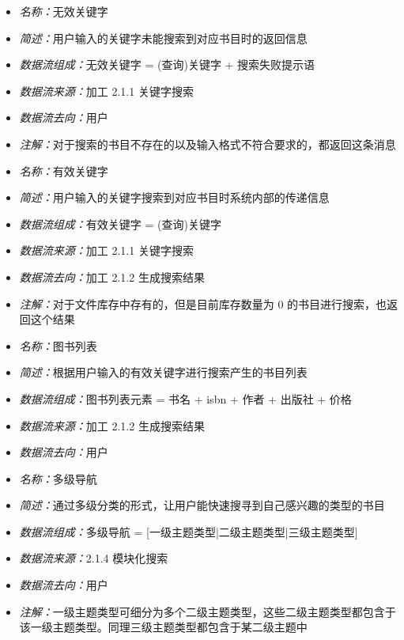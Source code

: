 \vspace{-1mm}

\begin{itemize}
	\item \textit{名称：}无效关键字
	\item \textit{简述：}用户输入的关键字未能搜索到对应书目时的返回信息
	\item \textit{数据流组成：}无效关键字 = (查询)关键字 + 搜索失败提示语
	\item \textit{数据流来源：}加工 2.1.1 关键字搜索
	\item \textit{数据流去向：}用户
	\item \textit{注解：}对于搜索的书目不存在的以及输入格式不符合要求的，都返回这条消息
\end{itemize}

\vspace{-1mm}

\begin{itemize}
	\item \textit{名称：}有效关键字
	\item \textit{简述：}用户输入的关键字搜索到对应书目时系统内部的传递信息
	\item \textit{数据流组成：}有效关键字 = (查询)关键字
	\item \textit{数据流来源：}加工 2.1.1 关键字搜索
	\item \textit{数据流去向：}加工 2.1.2 生成搜索结果
	\item \textit{注解：}对于文件库存中存有的，但是目前库存数量为 0 的书目进行搜索，也返回这个结果
\end{itemize}

\vspace{-1mm}

\begin{itemize}
	\item \textit{名称：}图书列表
	\item \textit{简述：}根据用户输入的有效关键字进行搜索产生的书目列表
	\item \textit{数据流组成：}图书列表元素 = 书名 + isbn + 作者 + 出版社 + 价格
	\item \textit{数据流来源：}加工 2.1.2 生成搜索结果
	\item \textit{数据流去向：}用户
\end{itemize}

\vspace{-1mm}

\begin{itemize}
	\item \textit{名称：}多级导航
	\item \textit{简述：}通过多级分类的形式，让用户能快速搜寻到自己感兴趣的类型的书目
	\item \textit{数据流组成：}多级导航 = [一级主题类型|二级主题类型|三级主题类型]
	\item \textit{数据流来源：}2.1.4 模块化搜索
	\item \textit{数据流去向：}用户
	\item \textit{注解：}一级主题类型可细分为多个二级主题类型，这些二级主题类型都包含于该一级主题类型。同理三级主题类型都包含于某二级主题中
\end{itemize}

